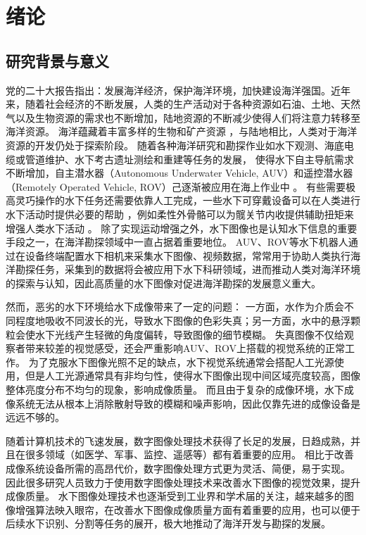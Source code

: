 
\chapter{绪论}

\section{研究背景与意义}
党的二十大报告指出：发展海洋经济，保护海洋环境，加快建设海洋强国。近年来，随着社会经济的不断发展，人类的生产活动对于各种资源如石油、土地、天然气以及生物资源的需求也不断增加，陆地资源的不断减少使得人们将注意力转移至海洋资源。
海洋蕴藏着丰富多样的生物和矿产资源 \cite{ocean_energy}，与陆地相比，人类对于海洋资源的开发仍处于探索阶段。
随着各种海洋研究和勘探作业如水下观测、海底电缆或管道维护、水下考古遗址测绘和重建等任务的发展，
使得水下自主导航需求不断增加，自主潜水器（Autonomous Underwater Vehicle, AUV）和遥控潜水器（Remotely Operated Vehicle, ROV）己逐渐被应用在海上作业中 \cite{auv}\cite{rov}。
有些需要极高灵巧操作的水下任务还需要依靠人工完成，一些水下可穿戴设备可以在人类进行水下活动时提供必要的帮助 \cite{Xia2022}，例如柔性外骨骼可以为髋关节内收提供辅助扭矩来增强人类水下活动 \cite{Xia2023}。
除了实现运动增强之外，水下图像也是认知水下信息的重要手段之一，在海洋勘探领域中一直占据着重要地位。\cite{underwater_perception}
AUV、ROV等水下机器人通过在设备终端配置水下相机来采集水下图像、视频数据，常常用于协助人类执行海洋勘探任务，采集到的数据将会被应用下水下科研领域，进而推动人类对海洋环境的探索与认知，因此高质量的水下图像对促进海洋勘探的发展意义重大。

然而，恶劣的水下环境给水下成像带来了一定的问题：
一方面，水作为介质会不同程度地吸收不同波长的光，导致水下图像的色彩失真；另一方面，水中的悬浮颗粒会使水下光线产生轻微的角度偏转，导致图像的细节模糊。
失真图像不仅给观察者带来较差的视觉感受，还会严重影响AUV、ROV上搭载的视觉系统的正常工作。
为了克服水下图像光照不足的缺点，水下视觉系统通常会搭配人工光源使用，但是人工光源通常具有非均匀性，使得水下图像出现中间区域亮度较高，图像整体亮度分布不均匀的现象，影响成像质量。
而且由于复杂的成像环境，水下成像系统无法从根本上消除散射导致的模糊和噪声影响，因此仅靠先进的成像设备是远远不够的。

随着计算机技术的飞速发展，数字图像处理技术获得了长足的发展，日趋成熟，并且在很多领域（如医学、军事、监控、遥感等）都有着重要的应用。
相比于改善成像系统设备所需的高昂代价，数字图像处理方式更为灵活、简便，易于实现。
因此很多研究人员致力于使用数字图像处理技术来改善水下图像的视觉效果，提升成像质量。
水下图像处理技术也逐渐受到工业界和学术届的关注，越来越多的图像增强算法映入眼帘，在改善水下图像成像质量方面有着重要的应用，也可以便于后续水下识别、分割等任务的展开，极大地推动了海洋开发与勘探的发展。

